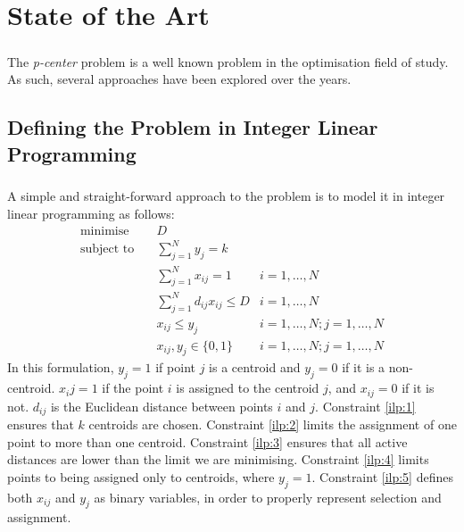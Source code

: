 \chapter{State of the Art}
\label{chap:sota}
\paragraph{}
The \emph{p-center} problem is a well known problem in the optimisation field of study. As such, several approaches have been explored over the years. 

\section{Defining the Problem in Integer Linear Programming}
\paragraph{}
A simple and straight-forward approach to the problem is to model it in  integer linear programming as follows:
\begin{align}
\text{minimise}   \quad& D							   &\\
\text{subject to} \quad
& \sum\limits_{j=1}^{N}{y_j} = k 
& 							\label{ilp:1}\\
& \sum\limits_{j=1}^{N}{x_{ij}}	= 1   
& i=1,\ldots,N 				\label{ilp:2}\\
& \sum\limits_{j=1}^{N}{d_{ij} x_{ij}} \leq D
& i=1,\ldots,N				\label{ilp:3}\\
& x_{ij} \leq y_{j}				   
& i=1,\ldots,N;j=1,\ldots,N	\label{ilp:4}\\
& x_{ij},y_{j} \in \{0,1\}
& i=1,\ldots,N;j=1,\ldots,N \label{ilp:5}
\end{align}
In this formulation, $y_j = 1$ if point $j$ is a centroid and $y_j = 0$ if it is a non-centroid.
$x_ij = 1$ if the point $i$ is assigned to the centroid $j$, and $x_{ij}=0$ if it is not.
$d_{ij}$ is the Euclidean distance between points $i$ and $j$.
Constraint \ref{ilp:1} ensures that $k$ centroids are chosen.
Constraint \ref{ilp:2} limits the assignment of one point to more than one centroid.
Constraint \ref{ilp:3} ensures that all active distances are lower than the limit we are minimising.
Constraint \ref{ilp:4} limits points to being assigned only to centroids, where $y_j=1$.
Constraint \ref{ilp:5} defines both $x_{ij}$ and $y_j$ as binary variables, in order to properly represent selection and assignment.
